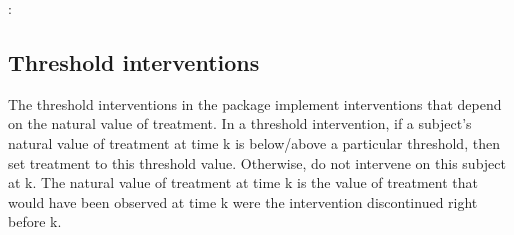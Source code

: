 \documentclass[letterpaper,10pt,english]{sphinxmanual}
\begin{document}
\begin{sphinxVerbatim}[commandchars=\\\{\}]
  \PYG{p}{[}\PYG{p}{]}

  
  

        
                
               
              \PYG{p}{[} \PYG{p}{[}      \PYG{p}{]}\PYG{p}{]}
              
\end{sphinxVerbatim}

\sphinxAtStartPar
{}:
\begin{quote}

\end{quote}


\subsection{Threshold interventions}
\label{\detokenize{Specifications/Interventions:threshold-interventions}}
\sphinxAtStartPar
The threshold interventions in the package implement interventions that depend on the natural value of treatment.
In a threshold intervention, if a subject’s natural value of treatment at time k is below/above a
particular threshold, then set treatment to this threshold value. Otherwise, do not intervene on this subject at k.
The natural value of treatment at time k is the value of treatment that would have been observed at
time k were the intervention discontinued right before k.
\end{document}
